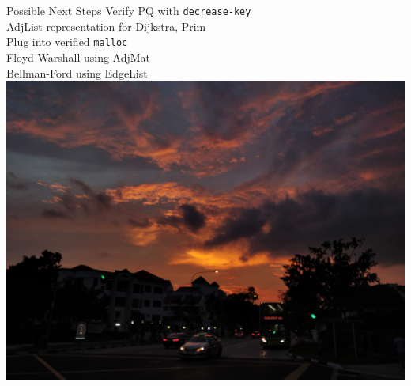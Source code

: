 \documentclass[usenames, xcolor=dvipsnames]{beamer}
\begin{document}
\begin{frame}{Possible Next Steps}
Verify PQ with \texttt{decrease-key} \\
AdjList representation for Dijkstra, Prim \\
Plug into verified \texttt{malloc} \\
Floyd-Warshall using AdjMat \\
Bellman-Ford using EdgeList \\

\flushright \pause
\includegraphics[scale=0.035]{sunset} \\
\hspace{1em}
\end{frame}
\end{document}
